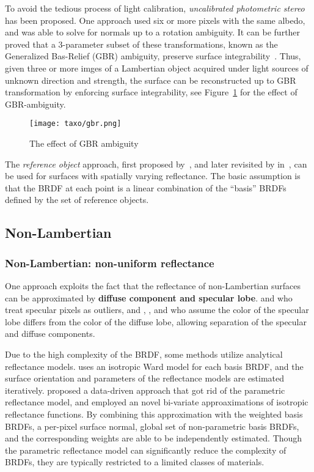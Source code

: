 To avoid the tedious process of light calibration, \textit{uncalibrated photometric stereo} has been proposed. One approach used six or more pixels with the same albedo, and was able to solve for normals up to a rotation ambiguity\cite{hayakawa1994photometric}. It can be further proved that a 3-parameter subset of these transformations, known as the Generalized Bas-Relief (GBR) ambiguity, preserve surface integrability~\cite{belhumeur1999bas}. Thus, given three or more imges of a Lambertian object acquired under light sources of unknown direction and strength, the surface can be reconstructed up to GBR transformation by enforcing surface integrability, see Figure~\ref{fig:gbr} for the effect of GBR-ambiguity.
\begin{figure}[!htbp]
\centering
\texttt{[image: taxo/gbr.png]}
\caption{The effect of GBR ambiguity}
\label{fig:gbr}
\end{figure}

The \textit{reference object} approach, first proposed by~\citeauthor{silver1980determining}, and later revisited by in~\cite{hertzmann2005example}, can be used for surfaces with spatially varying reflectance. The basic assumption is that the BRDF at each point is a linear combination of the ``basis'' BRDFs defined by the set of reference objects.

\subsection{Non-Lambertian}
\subsubsection{Non-Lambertian: non-uniform reflectance}
One approach exploits the fact that the reflectance of non-Lambertian surfaces can be approximated by \textbf{diffuse component and specular lobe}. \citeauthor{coleman1982obtaining} and \citeauthor{barsky20034} who treat specular pixels as outliers, and \citeauthor{schluns1993photometric}, \citeauthor{sato1994temporal}, and \citeauthor{mallick2005beyond} who assume the color of the specular lobe differs from the color of the diffuse lobe, allowing separation of the specular and diffuse components.

Due to the high complexity of the BRDF, some methods utilize {analytical reflectance models}. \citeauthor{goldman2010shape} uses an isotropic Ward model for each basis BRDF, and the surface orientation and parameters of the reflectance models are estimated iteratively. \citeauthor{alldrin2008photometric} proposed a data-driven approach that got rid of the parametric reflectance model, and employed an novel bi-variate approaximations of isotropic reflectance functions. By combining this approximation with the weighted basis BRDFs, a per-pixel surface normal, global set of non-parametric basis BRDFs, and the corresponding weights are able to be independently estimated. Though the parametric reflectance model can significantly reduce the complexity of BRDFs, they are typically restricted to a limited classes of materials.

